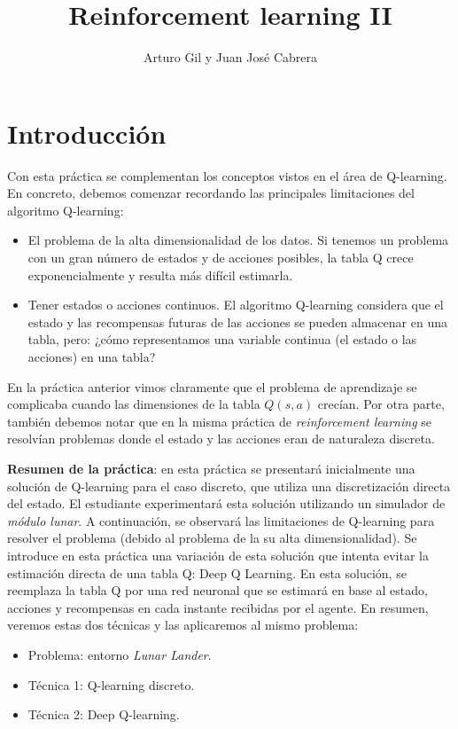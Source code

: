 \documentclass{article}
\title{Reinforcement learning II}
\author{Arturo Gil y Juan José Cabrera}
\begin{document}
\maketitle

\section{Introducción}
Con esta práctica se complementan los conceptos vistos en el área de Q-learning. En concreto, debemos comenzar recordando las principales limitaciones del algoritmo Q-learning:
\begin{itemize}
	\item  El problema de la alta dimensionalidad de los datos. Si tenemos un problema con un gran número de estados y de acciones posibles, la tabla Q crece exponencialmente y resulta más difícil estimarla.
	\item Tener estados o acciones continuos. El algoritmo Q-learning considera que el estado y las recompensas futuras de las acciones se pueden almacenar en una tabla, pero: ¿cómo representamos una variable continua (el estado o las acciones) en una tabla? 
\end{itemize}

 En la práctica anterior vimos claramente que el problema de aprendizaje se complicaba cuando las dimensiones de la tabla $Q(s, a)$ crecían. Por otra parte, también debemos notar que en la misma práctica de \textit{reinforcement learning} se resolvían problemas donde el estado y las acciones eran de naturaleza discreta.

\textbf{Resumen de la práctica}: en esta práctica se presentará inicialmente una solución de Q-learning  para el caso discreto, que utiliza una discretización directa del estado. El estudiante experimentará esta solución utilizando un simulador de  \textit{módulo lunar}. A continuación, se observará las limitaciones de Q-learning para resolver el problema (debido al problema de la su alta dimensionalidad). Se introduce en esta práctica una variación de esta solución que intenta evitar la estimación directa de una tabla Q: Deep Q Learning. En esta solución, se reemplaza la tabla Q por una red neuronal que se estimará en base al estado, acciones y recompensas en cada instante recibidas por el agente. En resumen, veremos estas dos técnicas y las aplicaremos al mismo problema:
\begin{itemize}
    \item Problema: entorno \textit{Lunar Lander}.
    \item Técnica 1: Q-learning discreto.
    \item Técnica 2: Deep Q-learning.
\end{itemize}
\end{document}
